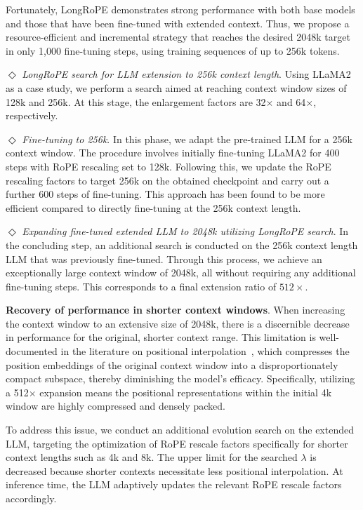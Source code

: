 Fortunately, LongRoPE demonstrates strong performance with both base models and those that have been fine-tuned with extended context. Thus, we propose a resource-efficient and incremental strategy that reaches the desired 2048k target in only 1,000 fine-tuning steps, using training sequences of up to 256k tokens.

$\Diamond$ \textit{LongRoPE search for LLM extension to 256k context length}. Using LLaMA2 as a case study, we perform a search aimed at reaching context window sizes of 128k and 256k. At this stage, the enlargement factors are 32$\times$ and 64$\times$, respectively.

$\Diamond$ \textit{Fine-tuning to 256k}. In this phase, we adapt the pre-trained LLM for a 256k context window. The procedure involves initially fine-tuning LLaMA2 for 400 steps with RoPE rescaling set to 128k. Following this, we update the RoPE rescaling factors to target 256k on the obtained checkpoint and carry out a further 600 steps of fine-tuning. This approach has been found to be more efficient compared to directly fine-tuning at the 256k context length.

$\Diamond$ \textit{Expanding fine-tuned extended LLM to 2048k utilizing LongRoPE search}. In the concluding step, an additional search is conducted on the 256k context length LLM that was previously fine-tuned. Through this process, we achieve an exceptionally large context window of 2048k, all without requiring any additional fine-tuning steps. This corresponds to a final extension ratio of $512\times$.

\textbf{Recovery of performance in shorter context windows}.  When increasing the context window to an extensive size of 2048k, there is a discernible decrease in performance for the original, shorter context range. This limitation is well-documented in the literature on positional interpolation~\cite{pi}, which compresses the position embeddings of the original context window into a disproportionately compact subspace, thereby diminishing the model’s efficacy. Specifically, utilizing a 512$\times$ expansion means the positional representations within the initial 4k window are highly compressed and densely packed.

To address this issue, we conduct an additional evolution search on the extended LLM, targeting the optimization of RoPE rescale factors specifically for shorter context lengths such as 4k and 8k. The upper limit for the searched $\lambda$ is decreased because shorter contexts necessitate less positional interpolation. At inference time, the LLM adaptively updates the relevant RoPE rescale factors accordingly.

